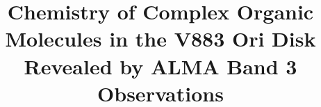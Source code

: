 \documentclass[linenumbers, twocolumn, twocolappendix, astrosymb, times]{aastex631}
\begin{document}
\title{Chemistry of Complex Organic Molecules in the V883 Ori Disk Revealed by ALMA Band 3 Observations}


\end{document}
